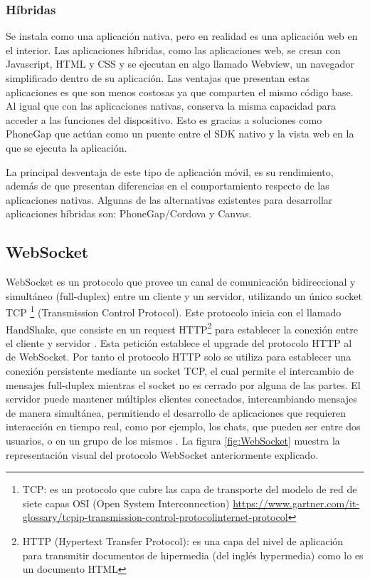 	\subsubsection{Híbridas}
	Se instala como una aplicación nativa, pero en realidad es una aplicación web en el interior. Las aplicaciones híbridas, como las aplicaciones web, se crean con Javascript, HTML y CSS y se ejecutan en algo llamado Webview, un navegador simplificado dentro de su aplicación.
	Las ventajas que presentan estas aplicaciones es que son menos costosas ya que comparten el mismo código base. Al igual que con las aplicaciones nativas, conserva la misma capacidad para acceder a las funciones del dispositivo. Esto es gracias a soluciones como PhoneGap que actúan como un puente entre el SDK nativo y la vista web en la que se ejecuta la aplicación. 
	
	La principal desventaja de este tipo de aplicación móvil, es su rendimiento, además de que presentan diferencias en el comportamiento respecto de las aplicaciones nativas. Algunas de las alternativas existentes para desarrollar aplicaciones híbridas son: PhoneGap/Cordova y Canvas. \citep{mobile-apps-types}

\subsection{WebSocket}
WebSocket es un protocolo que provee un canal de comunicación bidireccional y simultáneo (full-duplex) entre un cliente y un servidor, utilizando un único socket TCP \footnote{TCP: es un protocolo que cubre las capa de transporte del modelo de red de siete capas OSI (Open System Interconnection) \url{https://www.gartner.com/it-glossary/tcpip-transmission-control-protocolinternet-protocol}} (Transmission Control Protocol). Este protocolo inicia con el llamado HandShake, que consiste en un request HTTP\footnote{HTTP (Hypertext Transfer Protocol): es una capa del nivel de aplicación para transmitir documentos de hipermedia (del inglés hypermedia) como lo es un documento HTML} para establecer la conexión entre el cliente y servidor \citep{websocket-html5} . Esta petición establece el upgrade del protocolo HTTP al de WebSocket. Por tanto el protocolo HTTP solo se utiliza para establecer una conexión persistente mediante un socket TCP, el cual permite el intercambio de mensajes full-duplex mientras el socket no es cerrado por alguna de las partes. El servidor puede mantener múltiples clientes conectados, intercambiando mensajes de manera simultánea, permitiendo el desarrollo de aplicaciones que requieren interacción en tiempo real, como por ejemplo, los chats, que pueden ser entre dos usuarios, o en un grupo de los mismos \citep{websocket-scalability} . La figura \ref{fig:WebSocket} muestra la representación visual del protocolo WebSocket anteriormente explicado.

